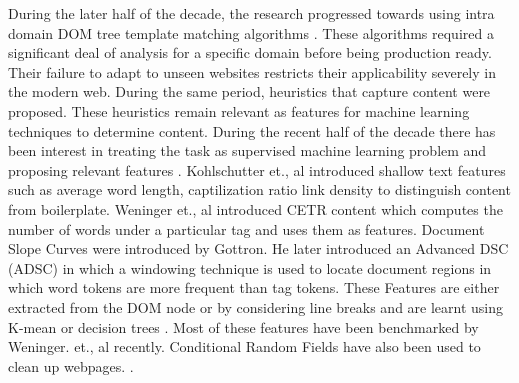 \documentclass{article} %
\begin{document}
During the later half of the decade, the research progressed towards using intra domain DOM tree template matching algorithms \cite{lin2002discovering}. These algorithms required a significant deal of analysis for a specific domain before being production ready. Their failure to adapt to unseen websites restricts their applicability severely in the modern web. During the same period, heuristics that capture content  \cite{pinto2002quasm} were proposed. These heuristics remain relevant as features for machine learning techniques to determine content. During the recent half of the decade there has been interest in  treating the task as supervised machine learning problem \cite{Kohlschutter:2010:BDU:1718487.1718542}  \cite{gottron2008content} and proposing relevant features \cite{weninger2008tex}. Kohlschutter et., al \cite{Kohlschutter:2010:BDU:1718487.1718542} introduced shallow text features such as average word length, captilization ratio link density to distinguish content from boilerplate. Weninger et., al \cite{weninger2008text} introduced CETR content  which computes the number of words under a particular tag and uses them as features. Document Slope Curves were introduced by Gottron. He later introduced an Advanced DSC (ADSC) \cite{gottron2008content} in which a windowing technique is used to locate document regions in which word tokens are more frequent than tag tokens. These Features are either extracted from the DOM node \cite{Kohlschutter:2010:BDU:1718487.1718542} \cite{gottron2008content} or by considering line breaks \cite{weninger2008tex}and  are learnt using K-mean \cite{weninger2008text} or decision trees \cite{Kohlschutter:2010:BDU:1718487.1718542}. Most of these features have been benchmarked by Weninger. et., al \cite{weninger2010cetr} recently. Conditional Random Fields have also been used to clean up webpages.  \cite{marek2007web}. 
\end{document}
